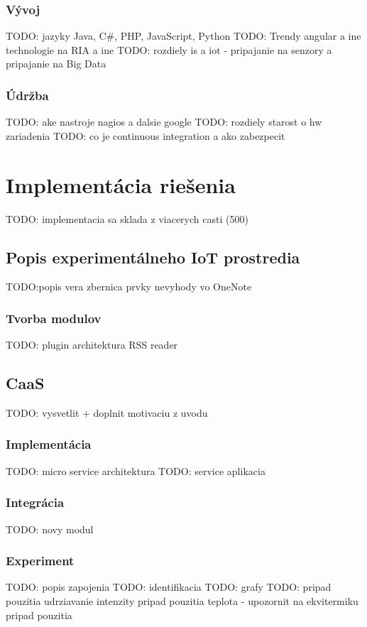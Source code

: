 \subsubsection{Vývoj}
TODO: jazyky Java, C\#, PHP, JavaScript, Python
TODO: Trendy angular a ine technologie na RIA a ine 
TODO: rozdiely is a iot - pripajanie na senzory a pripajanie na Big Data
\subsubsection{Údržba}
TODO: ake nastroje nagios a dalsie google
TODO: rozdiely starost o hw zariadenia
TODO: co je continuous integration a ako zabezpecit


\section{Implementácia riešenia}
TODO: implementacia sa sklada z viacerych casti (500)
\subsection{Popis experimentálneho IoT prostredia}
TODO:popis
vera 
zbernica 
prvky
nevyhody vo OneNote

\subsubsection{Tvorba modulov}
TODO: plugin architektura RSS reader
\subsection{CaaS}
TODO: vysvetlit + doplnit motivaciu z uvodu
\subsubsection{Implementácia}
TODO: micro service architektura
TODO: service aplikacia
\subsubsection{Integrácia}
TODO: novy modul
\subsubsection{Experiment}
TODO: popis zapojenia
TODO: identifikacia
TODO: grafy
TODO: 
pripad pouzitia udrziavanie intenzity
pripad pouzitia teplota - upozornit na ekvitermiku
pripad pouzitia
